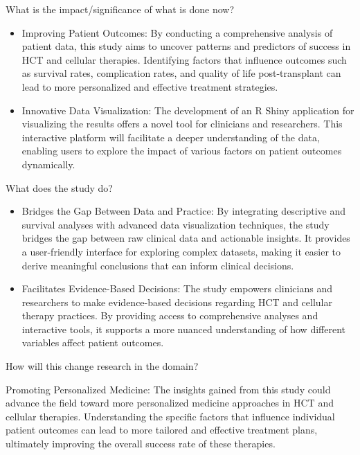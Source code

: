 \documentclass[11pt,]{article}
\providecommand{\tightlist}{%
  \setlength{\itemsep}{0pt}\setlength{\parskip}{0pt}}
\begin{document}
What is the impact/significance of what is done now?

\begin{itemize}
\item
  Improving Patient Outcomes: By conducting a comprehensive analysis of
  patient data, this study aims to uncover patterns and predictors of
  success in HCT and cellular therapies. Identifying factors that
  influence outcomes such as survival rates, complication rates, and
  quality of life post-transplant can lead to more personalized and
  effective treatment strategies.
\item
  Innovative Data Visualization: The development of an R Shiny
  application for visualizing the results offers a novel tool for
  clinicians and researchers. This interactive platform will facilitate
  a deeper understanding of the data, enabling users to explore the
  impact of various factors on patient outcomes dynamically.
\end{itemize}

What does the study do?

\begin{itemize}
\tightlist
\item
  Bridges the Gap Between Data and Practice: By integrating descriptive
  and survival analyses with advanced data visualization techniques, the
  study bridges the gap between raw clinical data and actionable
  insights. It provides a user-friendly interface for exploring complex
  datasets, making it easier to derive meaningful conclusions that can
  inform clinical decisions.\\
\item
  Facilitates Evidence-Based Decisions: The study empowers clinicians
  and researchers to make evidence-based decisions regarding HCT and
  cellular therapy practices. By providing access to comprehensive
  analyses and interactive tools, it supports a more nuanced
  understanding of how different variables affect patient outcomes.
\end{itemize}

How will this change research in the domain?

Promoting Personalized Medicine: The insights gained from this study
could advance the field toward more personalized medicine approaches in
HCT and cellular therapies. Understanding the specific factors that
influence individual patient outcomes can lead to more tailored and
effective treatment plans, ultimately improving the overall success rate
of these therapies.
\end{document}

